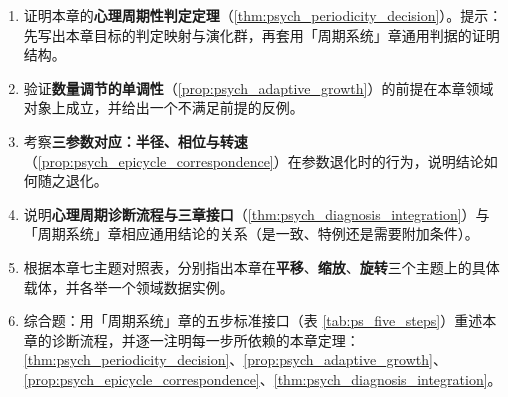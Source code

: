 \begin{enumerate}[leftmargin=3em, label=\textbf{题 \arabic*}]
    \item 证明本章的\textbf{心理周期性判定定理}（\ref{thm:psych_periodicity_decision}）。提示：先写出本章目标的判定映射与演化群，再套用「周期系统」章通用判据的证明结构。

    \item 验证\textbf{数量调节的单调性}（\ref{prop:psych_adaptive_growth}）的前提在本章领域对象上成立，并给出一个不满足前提的反例。

    \item 考察\textbf{三参数对应：半径、相位与转速}（\ref{prop:psych_epicycle_correspondence}）在参数退化时的行为，说明结论如何随之退化。

    \item 说明\textbf{心理周期诊断流程与三章接口}（\ref{thm:psych_diagnosis_integration}）与「周期系统」章相应通用结论的关系（是一致、特例还是需要附加条件）。

    \item 根据本章七主题对照表，分别指出本章在\textbf{平移}、\textbf{缩放}、\textbf{旋转}三个主题上的具体载体，并各举一个领域数据实例。

    \item 综合题：用「周期系统」章的五步标准接口（表 \ref{tab:ps_five_steps}）重述本章的诊断流程，并逐一注明每一步所依赖的本章定理：\ref{thm:psych_periodicity_decision}、\ref{prop:psych_adaptive_growth}、\ref{prop:psych_epicycle_correspondence}、\ref{thm:psych_diagnosis_integration}。
\end{enumerate}


